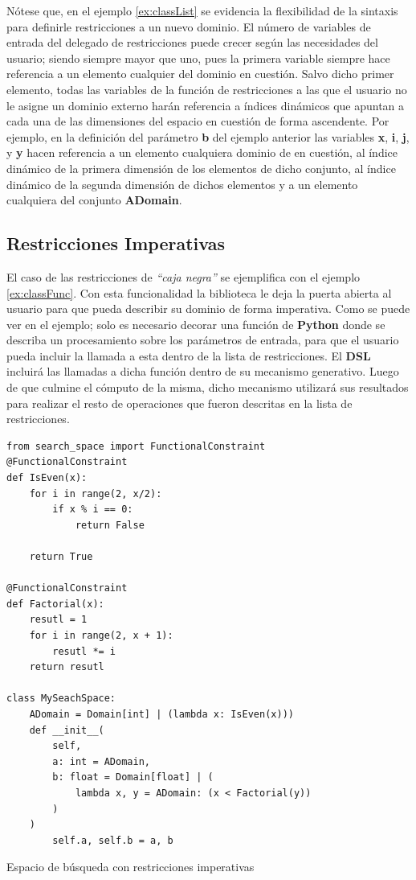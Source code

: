 Nótese que, en el ejemplo \ref{ex:classList} se evidencia la flexibilidad de la sintaxis para definirle restricciones a un
nuevo dominio. El número de variables de entrada del delegado de restricciones puede crecer según las necesidades
del usuario; siendo siempre mayor que uno, pues la primera variable siempre hace referencia a un elemento cualquier
del dominio en cuestión. Salvo dicho primer elemento, todas las variables de la función de restricciones a las que
el usuario no le asigne un dominio externo harán referencia a índices dinámicos que apuntan a cada una de las
dimensiones del espacio en cuestión de forma ascendente. Por ejemplo, en la definición del parámetro {\bf b} del
ejemplo anterior las variables {\bf x}, {\bf i}, {\bf j}, y {\bf y} hacen referencia a un elemento cualquiera
dominio de en cuestión, al índice dinámico de la primera dimensión de los elementos de dicho conjunto, al índice dinámico
de la segunda dimensión de dichos elementos y a un elemento cualquiera del conjunto {\bf ADomain}.

\subsection{Restricciones Imperativas}

El caso de las restricciones de {\it “caja negra”} se ejemplifica con el ejemplo \ref{ex:classFunc}. Con esta funcionalidad
la biblioteca le deja la puerta abierta al usuario para que pueda describir su dominio de forma imperativa.
Como se puede ver en el ejemplo; solo es necesario decorar una función de {\bf Python} donde se describa un
procesamiento sobre los parámetros de entrada, para que el usuario pueda incluir la llamada a esta dentro de
la lista de restricciones. El {\bf DSL} incluirá las llamadas a dicha función dentro de su mecanismo generativo.
Luego de que culmine el cómputo de la misma, dicho mecanismo utilizará sus resultados para realizar el resto
de operaciones que fueron descritas en la lista de restricciones.

\begin{listing}[!ht]
    \begin{verbatim}
from search_space import FunctionalConstraint
@FunctionalConstraint
def IsEven(x):
    for i in range(2, x/2):
        if x % i == 0:
            return False
        
    return True

@FunctionalConstraint
def Factorial(x):
    resutl = 1
    for i in range(2, x + 1):
        resutl *= i
    return resutl

class MySeachSpace:
    ADomain = Domain[int] | (lambda x: IsEven(x)))
    def __init__(
        self, 
        a: int = ADomain,
        b: float = Domain[float] | (
            lambda x, y = ADomain: (x < Factorial(y))
        )
    )
        self.a, self.b = a, b

    \end{verbatim}
    \caption{Espacio de búsqueda con restricciones imperativas}
    \label{ex:classFunc}
\end{listing}


